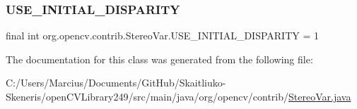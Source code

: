 \subsubsection{\texorpdfstring{U\+S\+E\+\_\+\+I\+N\+I\+T\+I\+A\+L\+\_\+\+D\+I\+S\+P\+A\+R\+I\+TY}{USE\_INITIAL\_DISPARITY}}
{\footnotesize\ttfamily final int org.\+opencv.\+contrib.\+Stereo\+Var.\+U\+S\+E\+\_\+\+I\+N\+I\+T\+I\+A\+L\+\_\+\+D\+I\+S\+P\+A\+R\+I\+TY = 1\hspace{0.3cm}{\ttfamily [static]}}



The documentation for this class was generated from the following file\+:\begin{DoxyCompactItemize}
\item 
C\+:/\+Users/\+Marcius/\+Documents/\+Git\+Hub/\+Skaitliuko-\/\+Skeneris/open\+C\+V\+Library249/src/main/java/org/opencv/contrib/\mbox{\hyperlink{_stereo_var_8java}{Stereo\+Var.\+java}}\end{DoxyCompactItemize}
